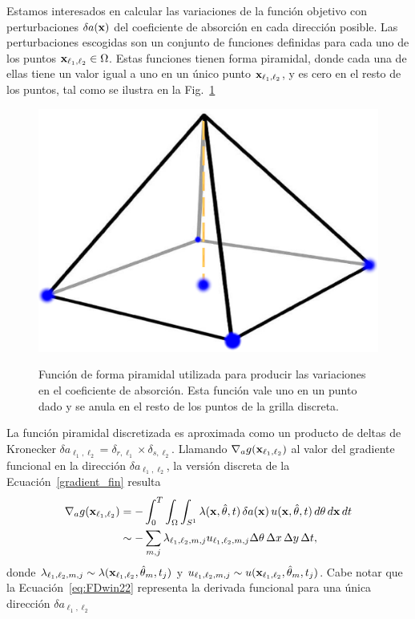 Estamos interesados 
en calcular las variaciones de la función objetivo 
con perturbaciones $\delta a(\mathbf{x})$ del coeficiente de 
absorción en cada dirección posible. 
Las perturbaciones escogidas son un conjunto de funciones 
definidas para cada uno de los puntos $\mathbf{x}_{\ell_1,\ell_2} \in \Omega$. Estas funciones tienen forma piramidal, donde cada una de ellas tiene un valor igual a uno en un único punto 
 $\mathbf{x}_{\ell_1,\ell_2}$, y es cero en el resto de los puntos, tal como se ilustra en la Fig.~\ref{fig:piramid} 
 \begin{figure}[h!]
\centering
  \includegraphics[width=0.5\linewidth]{figuras/piramide.eps}\\
  \caption{
Función de forma piramidal utilizada para producir las variaciones 
en el coeficiente de absorción. Esta función vale uno en un  punto dado 
y se anula en el resto de los puntos de la grilla discreta.}
 \label{fig:piramid}
\end{figure}
 La función piramidal discretizada es aproximada como un producto 
 de deltas de Kronecker $\delta a_{\ell_1,\ell_2}=\delta_{r,\ell_1}\times\delta_{s,\ell_2}$.
 Llamando $\nabla_a g(\mathbf{x}_{\ell_1,\ell_2})$ al valor del gradiente funcional 
 en la dirección $\delta a_{\ell_1,\ell_2}$, la versión discreta 
 de la Ecuación~\eqref{gradient_fin} resulta
\begin{equation}
\begin{aligned}
\nabla_a g(\mathbf{x}_{\ell_1,\ell_2}) & =- \int_0^T \int_{\Omega} \int_{S^1} \lambda(\mathbf{x},\hat{\theta},t) \, \delta
  a(\mathbf{x}) \, u(\mathbf{x},\hat{\theta},t) \, d \theta \, d\mathbf{x} \, dt \\ & \sim -\sum_{m,j}  \lambda_{\ell_1,\ell_2,m,j}u_{\ell_1,\ell_2,m,j} \Delta \theta \, \Delta x \, \Delta y \, \Delta t,
\end{aligned}
\label{eq:FDwin22}
\end{equation}
donde $\lambda_{\ell_1,\ell_2,m,j}\sim
\lambda(\mathbf{x}_{\ell_1,\ell_2},\hat{\theta}_m,t_j)$ y 
$u_{\ell_1,\ell_2,m,j} \sim u(\mathbf{x}_{\ell_1,\ell_2},\hat{\theta}_m,t_j)$. 
Cabe notar que la Ecuación~\eqref{eq:FDwin22} representa 
la derivada funcional para una única dirección $\delta a_{\ell_1,\ell_2}$ 
